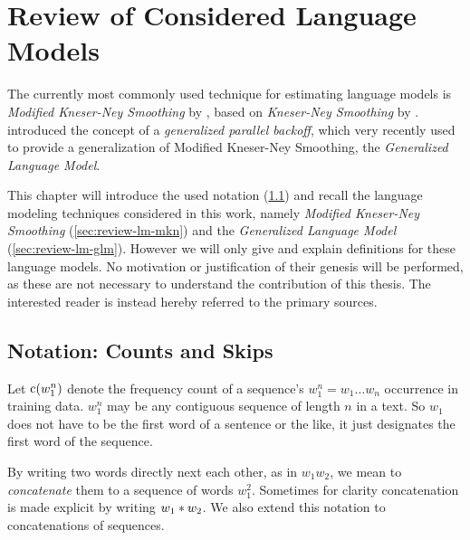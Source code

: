 \chapter{Review of Considered Language Models}
\label{ch:review}

The currently most commonly used \parencite{JurafskyMartin2009,Chelba2013}
technique for estimating language models is \emph{Modified Kneser-Ney Smoothing}
by \textcite{ChenGoodman1996,ChenGoodman1998,ChenGoodman1999}, based on
\emph{Kneser-Ney Smoothing} by \textcite{KneserNey1995}.
\textcite{BilmesKirchhoff2003} introduced the concept of a \emph{generalized
parallel backoff}, which very recently \textcite{Pickhardt2014} used to provide
a generalization of Modified Kneser-Ney Smoothing, the \emph{Generalized
Language Model}.

This chapter will introduce the used notation (\cref{sec:review-notation})
and recall the language modeling techniques considered in this work,
namely \emph{Modified Kneser-Ney Smoothing} (\cref{sec:review-lm-mkn}) and the
\emph{Generalized Language Model} (\cref{sec:review-lm-glm}).
However we will only give and explain definitions for these language models.
No motivation or justification of their genesis will be performed, as these are
not necessary to understand the contribution of this thesis.
The interested reader is instead hereby referred to the primary sources.


\section{Notation: Counts and Skips}
\label{sec:review-notation}

Let $\operatorname{c}(w_1^n)$ denote the frequency count of a sequence's
$w_1^n = w_1 \ldots w_n$ occurrence in training data.
$w_1^n$ may be any contiguous sequence of length $n$ in a text.
So $w_1$ does not have to be the first word of a sentence or the like,
it just designates the first word of the sequence.

By writing two words directly next each other, as in $w_1 w_2$, we mean to
\emph{concatenate} them to a sequence of words $w_1^2$.
Sometimes for clarity concatenation is made explicit by writing
$w_1 * w_2$. We also extend this notation to concatenations of
sequences.

